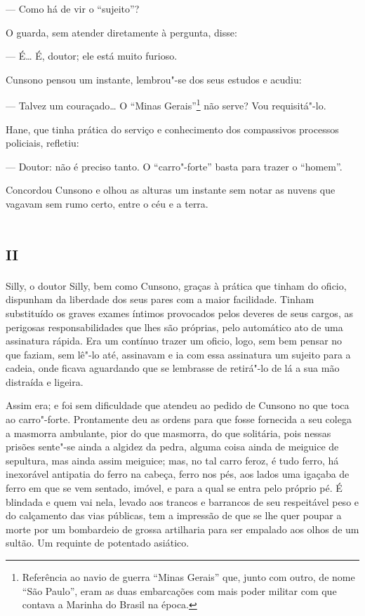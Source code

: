 --- Como há de vir o ``sujeito''?

O guarda, sem atender diretamente à pergunta, disse:

--- É\ldots{} É, doutor; ele está muito furioso.

Cunsono pensou um instante, lembrou"-se dos seus estudos e acudiu:

--- Talvez um couraçado\ldots{} O ``Minas Gerais''\footnote{Referência ao navio
  de guerra ``Minas Gerais'' que, junto com outro, de nome ``São
  Paulo'', eram as duas embarcações com mais poder militar com que
  contava a Marinha do Brasil na época.} não serve? Vou requisitá"-lo.

Hane, que tinha prática do serviço e conhecimento dos compassivos
processos policiais, refletiu:

--- Doutor: não é preciso tanto. O ``carro"-forte'' basta para trazer o
``homem''.

Concordou Cunsono e olhou as alturas um instante sem notar as nuvens que
vagavam sem rumo certo, entre o céu e a terra.

\section*{\textsc{ii}}

Silly, o doutor Silly, bem como Cunsono, graças à prática que tinham do
oficio, dispunham da liberdade dos seus pares com a maior facilidade.
Tinham substituído os graves exames íntimos provocados pelos deveres de
seus cargos, as perigosas responsabilidades que lhes são próprias, pelo
automático ato de uma assinatura rápida. Era um contínuo trazer um
oficio, logo, sem bem pensar no que faziam, sem lê"-lo até, assinavam e
ia com essa assinatura um sujeito para a cadeia, onde ficava aguardando
que se lembrasse de retirá"-lo de lá a sua mão distraída e ligeira.

Assim era; e foi sem dificuldade que atendeu ao pedido de Cunsono no que
toca ao carro"-forte. Prontamente deu as ordens para que fosse fornecida
a seu colega a masmorra ambulante, pior do que masmorra, do que
solitária, pois nessas prisões sente"-se ainda a algidez da pedra, alguma
coisa ainda de meiguice de sepultura, mas ainda assim meiguice; mas, no
tal carro feroz, é tudo ferro, há inexorável antipatia do ferro na
cabeça, ferro nos pés, aos lados uma igaçaba de ferro em que se vem
sentado, imóvel, e para a qual se entra pelo próprio pé. É blindada e
quem vai nela, levado aos trancos e barrancos de seu respeitável peso e
do calçamento das vias públicas, tem a impressão de que se lhe quer
poupar a morte por um bombardeio de grossa artilharia para ser empalado
aos olhos de um sultão. Um requinte de potentado asiático.

